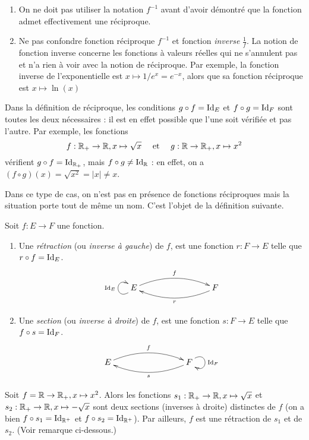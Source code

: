 \begin{attention}
\begin{enumerate}
\item On ne doit pas utiliser la notation $f^{-1}$ avant d'avoir démontré que la fonction admet effectivement une réciproque.
\item Ne pas confondre fonction réciproque $f^{-1}$ et fonction \emph{inverse} $\frac{1}{f}$. La notion de fonction inverse  concerne les fonctions à valeurs réelles qui ne s'annulent pas et n'a rien à voir avec la notion de réciproque. Par exemple, la fonction inverse de l'exponentielle est $x\mapsto 1/e^x = e^{-x}$, alors que sa fonction réciproque est $x\mapsto \ln(x)$
\end{enumerate}
\end{attention}

\begin{attention}
Dans la définition de réciproque, les conditions $g\circ f = \operatorname{Id}_E$ et  $f\circ g = \operatorname{Id}_F$ sont toutes les deux nécessaires : il est en effet possible que l'une soit vérifiée et pas l'autre. Par exemple, les fonctions 
\[
f : \mathbb{R}_+\to \mathbb{R}, x\mapsto \sqrt x
\quad \text{ et }\quad
g : \mathbb{R}\to \mathbb{R}_+, x\mapsto x^2
\]
vérifient $g\circ f=\operatorname{Id}_{\mathbb{R}_+}$, mais $f\circ g \neq \operatorname{Id}_{\mathbb{R}}$ : en effet, on a $(f\circ g)(x)=\sqrt{x^2}=|x|\neq x$.

Dans ce type de cas, on n'est pas en présence de fonctions réciproques mais la situation porte tout de même un nom. C'est l'objet de la définition suivante.
\end{attention}

\begin{definition}
Soit $f : E\to F$ une fonction.
\begin{enumerate}
\item Une \emph{rétraction} (ou \emph{inverse à gauche}) de $f$, est une fonction $r:F\to E$ telle que $r\circ f = \operatorname{Id}_E$.
\[
\xymatrix{
 E \ar@(dl,ul)^{\Id_E} \ar@/^1pc/[rrr]^{f}
& & & 
\ar@/^1pc/[lll]^{r}  F 
}
\]
\item Une \emph{section} (ou \emph{inverse à droite}) de $f$, est une fonction $s:F\to E$ telle que $f \circ s = \operatorname{Id}_F$.
\[
\xymatrix{
 E  \ar@/^1pc/[rrr]^{f} 
& & & 
\ar@/^1pc/[lll]^{s}  F \ar@(ur,dr)^{\Id_F}
}
\]
\end{enumerate}
\end{definition}

\begin{exemple}
Soit $f = \mathbb{R}\to \mathbb{R}_+, x\mapsto x^2$. Alors les fonctions $s_1 : \mathbb{R}_+\to \mathbb{R}, x\mapsto \sqrt x$ et $s_2 : \mathbb{R}_+\to \mathbb{R}, x\mapsto -\sqrt x$ sont deux sections (inverses à droite) distinctes de $f$ (on a bien $f\circ s_1 = \operatorname{Id}_{\mathbb{R}^+}$ et $f\circ s_2 = \operatorname{Id}_{\mathbb{R}^+}$). 
Par ailleurs, $f$ est une rétraction de $s_1$ et de $s_2$. (Voir remarque ci-dessous.)
\end{exemple}

